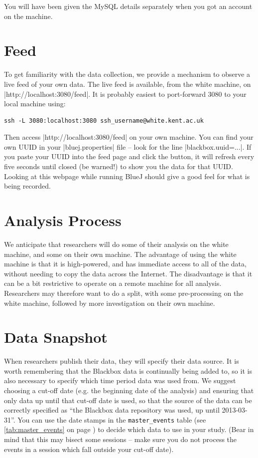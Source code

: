 \documentclass{report}
\newcommand{\myref}[1]{\autoref{#1} on page \pageref*{#1}}
\newcommand{\tabref}[1]{\lstinline|#1| table (see \myref{tab:#1})}
\begin{document}
You will have been given the MySQL details separately when you got an account on the machine.

\section{Feed}

To get familiarity with the data collection, we provide a mechanism to observe
a live feed of your own data.  The live feed is available, from the
white machine, on |http://localhost:3080/feed|.  It is probably easiest to
port-forward 3080 to your local machine using:

\begin{lstlisting}
ssh -L 3080:localhost:3080 ssh_username@white.kent.ac.uk
\end{lstlisting}

Then access |http://localhost:3080/feed| on your own machine.  You can find
your own UUID in your |bluej.properties| file -- look for the line
|blackbox.uuid=...|.  If you paste your UUID into the feed page and click the
button, it will refresh every five seconds until closed (be warned!) to show
you the data for that UUID.  Looking at this webpage while running BlueJ
should give a good feel for what is being recorded.

\section{Analysis Process}

We anticipate that researchers will do some of their analysis on the white
machine, and some on their own machine.  The advantage of using the white
machine is that it is high-powered, and has immediate access to all of the
data, without needing to copy the data across the Internet.  The disadvantage
is that it can be a bit restrictive to operate on a remote machine for all
analysis.  Researchers may therefore want to do a split, with some
pre-processing on the white machine, followed by more investigation on their
own machine.

\section{Data Snapshot}

When researchers publish their data, they will specify their data source.  It
is worth remembering that the Blackbox data is continually being added to, so
it is also necessary to specify which time period data was used from.  We
suggest choosing a cut-off date (e.g. the beginning date of the analysis) and
ensuring that only data up until that cut-off date is used, so that the source
of the data can be correctly specified as ``the Blackbox data repository was
used, up until 2013-03-31''.  You can use the date stamps in the
\tabref{master_events} to decide which data to use in your study.  (Bear in
mind that this may bisect some sessions -- make sure you do not process the
events in a session which fall outside your cut-off date).
\end{document}
